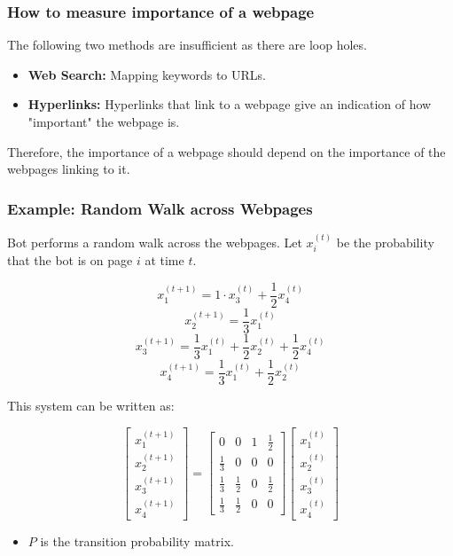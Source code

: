 \subsubsection{How to measure importance of a webpage}
\begin{intuition}
    The following two methods are insufficient as there are loop holes.
    \begin{itemize}
        \item \textbf{Web Search:} Mapping keywords to URLs. 
        \item \textbf{Hyperlinks:} Hyperlinks that link to a webpage give an indication of how "important" the webpage is. 
    \end{itemize}
    \vspace{1em}

    Therefore, the importance of a webpage should depend on the importance of the webpages linking to it.
\end{intuition}

\subsubsection{Example: Random Walk across Webpages}
\begin{example}
    Bot performs a random walk across the webpages. Let $x_i^{(t)}$ be the probability that the bot is on page $i$ at time $t$. 

\[
x_1^{(t+1)} = 1 \cdot x_3^{(t)} + \frac{1}{2} x_4^{(t)}
\]
\[
x_2^{(t+1)} = \frac{1}{3} x_1^{(t)}
\]
\[
x_3^{(t+1)} = \frac{1}{3} x_1^{(t)} + \frac{1}{2} x_2^{(t)} + \frac{1}{2} x_4^{(t)}
\]
\[
x_4^{(t+1)} = \frac{1}{3} x_1^{(t)} + \frac{1}{2} x_2^{(t)}
\]

This system can be written as:

\begin{equation*}
\begin{bmatrix}
x_1^{(t+1)} \\
x_2^{(t+1)} \\
x_3^{(t+1)} \\
x_4^{(t+1)}
\end{bmatrix}
=
\begin{bmatrix}
0 & 0 & 1 & \frac{1}{2} \\
\frac{1}{3} & 0 & 0 & 0 \\
\frac{1}{3} & \frac{1}{2} & 0 & \frac{1}{2} \\
\frac{1}{3} & \frac{1}{2} & 0 & 0 
\end{bmatrix}
\begin{bmatrix}
x_1^{(t)} \\
x_2^{(t)} \\
x_3^{(t)} \\
x_4^{(t)}
\end{bmatrix}
\end{equation*}
\begin{itemize}
    \item $P$ is the transition probability matrix. 
\end{itemize}
\vspace{1em}
\end{example}

